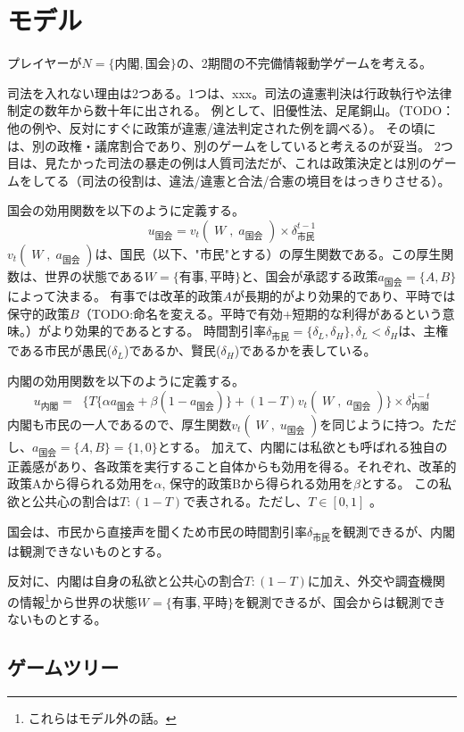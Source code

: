 \documentclass[main.tex]{subfiles}
\begin{document}
\section{モデル}

プレイヤーが$N=\lbrace 内閣, 国会 \rbrace$の、2期間の不完備情報動学ゲームを考える。



司法を入れない理由は2つある。1つは、xxx。司法の違憲判決は行政執行や法律制定の数年から数十年に出される。
例として、旧優性法、足尾銅山。（TODO：他の例や、反対にすぐに政策が違憲/違法判定された例を調べる）。
その頃には、別の政権・議席割合であり、別のゲームをしていると考えるのが妥当。
2つ目は、見たかった司法の暴走の例は人質司法だが、これは政策決定とは別のゲームをしてる（司法の役割は、違法/違憲と合法/合憲の境目をはっきりさせる）。


国会の効用関数を以下のように定義する。
$$u_\text{国会} = v_t(\;W\;,\; a_\text{国会}\;) × \delta^{t-1}_\text{市民}$$
$v_t(\;W\;,\; a_\text{国会}\;)$は、国民（以下、"市民"とする）の厚生関数である。この厚生関数は、世界の状態である$W=\lbrace 有事, 平時\rbrace$と、国会が承認する政策$a_{国会}=\lbrace A, B\rbrace$によって決まる。
有事では改革的政策$A$が長期的がより効果的であり、平時では保守的政策$B$（TODO:命名を変える。平時で有効+短期的な利得があるという意味。）がより効果的であるとする。
時間割引率$\delta_{市民}=\lbrace \delta_L, \delta_H \rbrace, \delta_L<\delta_H$は、主権である市民が愚民($\delta_L$)であるか、賢民($\delta_H$)であるかを表している。

内閣の効用関数を以下のように定義する。
$$ u_\text{内閣} =\;\; \lbrace T\lbrace \alpha a_\text{国会} + \beta (1-a_\text{国会}) \rbrace  + (1-T)v_t(\;W\;,\; a_\text{国会}\;) \rbrace × \delta^{1-t}_{内閣}$$
内閣も市民の一人であるので、厚生関数$v_t(\;W\;,\; u_\text{国会}\;)$を同じように持つ。ただし、$a_{国会}=\lbrace A, B\rbrace = \lbrace 1,0\rbrace$とする。
加えて、内閣には私欲とも呼ばれる独自の正義感があり、各政策を実行すること自体からも効用を得る。それぞれ、改革的政策Aから得られる効用を$\alpha$, 保守的政策Bから得られる効用を$\beta$とする。
この私欲と公共心の割合は$T:(1-T)$で表される。ただし、$T\in[0,1]$ 。

国会は、市民から直接声を聞くため市民の時間割引率$\delta_{市民}$を観測できるが、内閣は観測できないものとする。

反対に、内閣は自身の私欲と公共心の割合$T:(1-T)$に加え、外交や調査機関の情報\footnote{これらはモデル外の話。}から世界の状態$W=\lbrace 有事, 平時\rbrace$を観測できるが、国会からは観測できないものとする。


\subsection{ゲームツリー}
\end{document}
